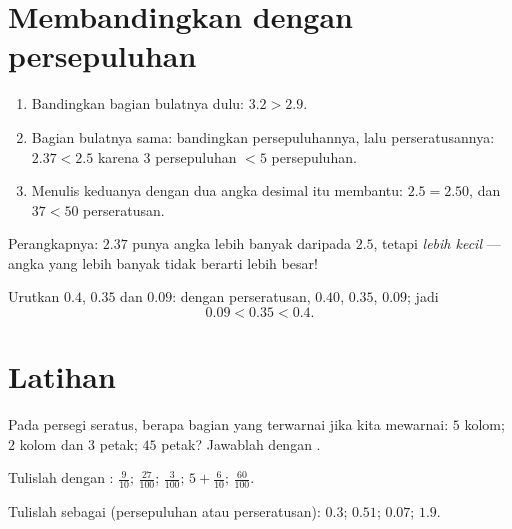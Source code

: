\section{Membandingkan dengan persepuluhan}

\begin{method}\label{met:g4:decimals:compare}
\begin{enumerate}
  \item Bandingkan bagian bulatnya dulu: $3.2 > 2.9$.
  \item Bagian bulatnya sama: bandingkan persepuluhannya, lalu
        perseratusannya: $2.37 < 2.5$ karena $3$ persepuluhan
        $< 5$ persepuluhan.
  \item Menulis keduanya dengan dua angka desimal itu membantu:
        $2.5 = 2.50$, dan $37 < 50$ perseratusan.
\end{enumerate}
Perangkapnya: $2.37$ punya angka lebih banyak daripada $2.5$, tetapi
\emph{lebih kecil} --- angka yang lebih banyak tidak berarti lebih besar!
\end{method}

\begin{example}\label{ex:g4:decimals:compare}
Urutkan $0.4$, $0.35$ dan $0.09$: dengan perseratusan, $0.40$,
$0.35$, $0.09$; jadi
\[
0.09 < 0.35 < 0.4 .
\]
\end{example}

\section{Latihan}

\begin{exercise}[$\star$]\label{exo:g4:decimals:1}
Pada persegi seratus, berapa bagian yang terwarnai jika kita
mewarnai: $5$ kolom; $2$ kolom dan $3$ petak; $45$ petak? Jawablah dengan .
\end{exercise}

\begin{exercise}[$\star$]\label{exo:g4:decimals:2}
Tulislah dengan :
$\frac{9}{10}$; \quad $\frac{27}{100}$; \quad $\frac{3}{100}$; \quad
$5 + \frac{6}{10}$; \quad $\frac{60}{100}$.
\end{exercise}

\begin{exercise}[$\star$]\label{exo:g4:decimals:3}
Tulislah sebagai  (persepuluhan atau perseratusan):
$0.3$; \quad $0.51$; \quad $0.07$; \quad $1.9$.
\end{exercise}

